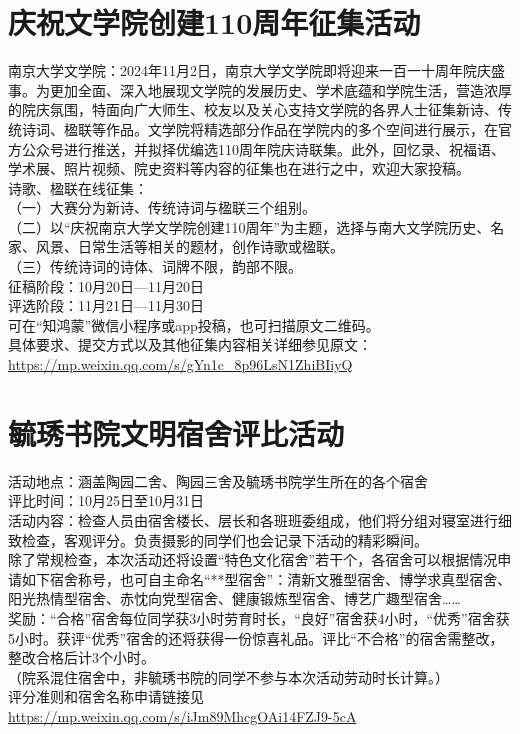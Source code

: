 \documentclass[letterpaper, 12pt]{article}
\begin{document}
\begin{multicols}{2}
\section{庆祝文学院创建110周年征集活动}
南京大学文学院：2024年11月2日，南京大学文学院即将迎来一百一十周年院庆盛事。为更加全面、深入地展现文学院的发展历史、学术底蕴和学院生活，营造浓厚的院庆氛围，特面向广大师生、校友以及关心支持文学院的各界人士征集新诗、传统诗词、楹联等作品。文学院将精选部分作品在学院内的多个空间进行展示，在官方公众号进行推送，并拟择优编选110周年院庆诗联集。此外，回忆录、祝福语、学术展、照片视频、院史资料等内容的征集也在进行之中，欢迎大家投稿。\\
诗歌、楹联在线征集：\\
（一）大赛分为新诗、传统诗词与楹联三个组别。\\
（二）以“庆祝南京大学文学院创建110周年”为主题，选择与南大文学院历史、名家、风景、日常生活等相关的题材，创作诗歌或楹联。\\
（三）传统诗词的诗体、词牌不限，韵部不限。\\
征稿阶段：10月20日—11月20日\\
评选阶段：11月21日—11月30日\\
可在“知鸿蒙”微信小程序或app投稿，也可扫描原文二维码。\\
具体要求、提交方式以及其他征集内容相关详细参见原文：\url{https://mp.weixin.qq.com/s/gYn1c_8p96LsN1ZhiBIiyQ}\\

\section{毓琇书院文明宿舍评比活动}
活动地点：涵盖陶园二舍、陶园三舍及毓琇书院学生所在的各个宿舍\\
评比时间：10月25日至10月31日\\
活动内容：检查人员由宿舍楼长、层长和各班班委组成，他们将分组对寝室进行细致检查，客观评分。负责摄影的同学们也会记录下活动的精彩瞬间。\\
除了常规检查，本次活动还将设置“特色文化宿舍”若干个，各宿舍可以根据情况申请如下宿舍称号，也可自主命名“**型宿舍”：清新文雅型宿舍、博学求真型宿舍、阳光热情型宿舍、赤忱向党型宿舍、健康锻炼型宿舍、博艺广趣型宿舍……\\
奖励：“合格”宿舍每位同学获3小时劳育时长，“良好”宿舍获4小时，“优秀”宿舍获5小时。获评“优秀”宿舍的还将获得一份惊喜礼品。评比“不合格”的宿舍需整改，整改合格后计3个小时。\\
（院系混住宿舍中，非毓琇书院的同学不参与本次活动劳动时长计算。）\\
评分准则和宿舍名称申请链接见\url{https://mp.weixin.qq.com/s/iJm89MhcgOAi14FZJ9-5cA}
\end{multicols}
\end{document}
